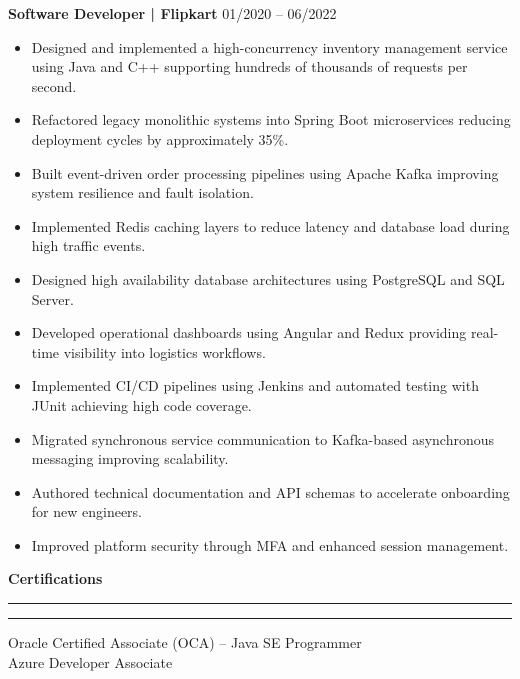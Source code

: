 \documentclass[10pt,letterpaper]{article}
\newcommand{\sectionline}{
  \vspace{2pt}
  \hrule
  \hrule
  \vspace{6pt}
}
\begin{document}
\vspace{4pt}
\textbf{Software Developer | Flipkart}      \hfill 01/2020 -- 06/2022\\
\vspace{-12pt}
\begin{itemize}
\item Designed and implemented a high-concurrency inventory management service using Java and C++ supporting hundreds of thousands of requests per second.
\item Refactored legacy monolithic systems into Spring Boot microservices reducing deployment cycles by approximately 35\%.
\item Built event-driven order processing pipelines using Apache Kafka improving system resilience and fault isolation.
\item Implemented Redis caching layers to reduce latency and database load during high traffic events.
\item Designed high availability database architectures using PostgreSQL and SQL Server.
\item Developed operational dashboards using Angular and Redux providing real-time visibility into logistics workflows.
\item Implemented CI/CD pipelines using Jenkins and automated testing with JUnit achieving high code coverage.
\item Migrated synchronous service communication to Kafka-based asynchronous messaging improving scalability.
\item Authored technical documentation and API schemas to accelerate onboarding for new engineers.
\item Improved platform security through MFA and enhanced session management.
\end{itemize}



\vspace{4pt}
\textbf{Certifications}
\sectionline

Oracle Certified Associate (OCA) -- Java SE Programmer\\
Azure Developer Associate
\end{document}
